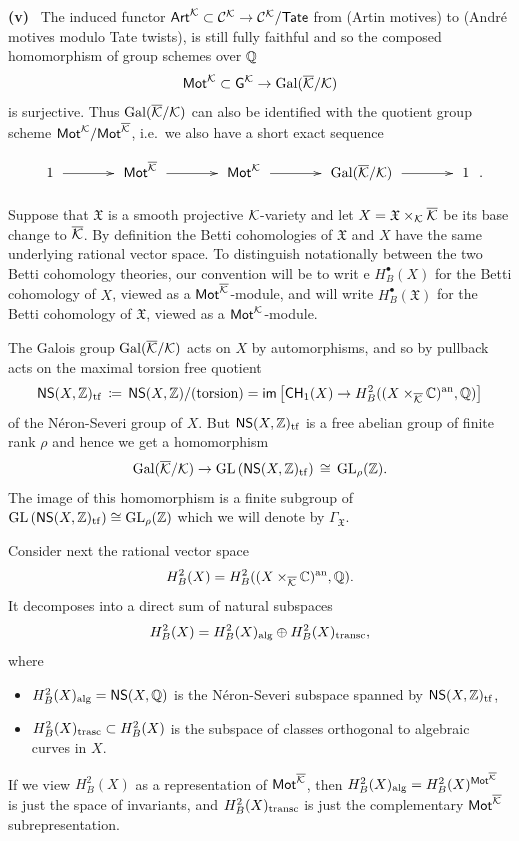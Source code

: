\documentclass[twoside,leqno]{article}
\numberwithin{equation}{section}
\theoremstyle{plain}
\theoremstyle{definition}
\begin{document}
\medskip

\noindent
{\bfseries (v)} \ The induced functor $\mathsf{Art}^{\mathcal K}  \subset \mathcal{C}^{\mathcal K}
\to \mathcal{C}^{\mathcal K}/\mathsf{Tate}$ from (Artin motives) to (Andr\'{e}
motives modulo Tate twists), is still fully faithful and so the
composed homomorphism of group schemes over $\mathbb Q$
\[
\mathsf{Mot}^{\mathcal K} \subset \mathsf{G}^{\mathcal K} \to \operatorname{Gal}(\overline{\mathcal K}/\mathcal K)
\]
is surjective. Thus $\operatorname{Gal}(\overline{\mathcal K}/\mathcal K)$ can also be
identified with the quotient group scheme
$\mathsf{Mot}^{\mathcal K}/\mathsf{Mot}^{\overline{\mathcal K}}$,  i.e.\ we also  
have a short exact sequence
\[
\xymatrix@1@M+0.5pc@C+1pc{ 1 \ar[r] & \motM^{\kaybar} \ar[r] & \motM^{\kay}
  \ar[r] & \Gal(\kaybar/\kay) \ar[r] & 1}.
\]


Suppose that $\mathfrak{X}$ is a smooth projective $\mathcal K$-variety and
let $X = \mathfrak{X}\times_{\mathcal K} \overline{\mathcal K}$ be its base change to
$\overline{\mathcal K}$. By definition the Betti cohomologies of $\mathfrak{X}$ and
$X$ have the same underlying rational vector space. To distinguish
notationally between the two Betti cohomology theories, our convention
will be to writ e $H^{\bullet}_{B}(X)$ for the Betti cohomology of
$X$, viewed as a $\mathsf{Mot}^{\overline{\mathcal K}}$-module, and will write
$H^{\bullet}_{B}(\mathfrak{X})$ for the Betti cohomology of
$\mathfrak{X}$, viewed as a $\mathsf{Mot}^{\mathcal K}$-module. 

\medskip


The Galois group $\operatorname{Gal}(\overline{\mathcal K}/\mathcal K)$ acts on
$X$ by automorphisms, and so by pullback acts on the maximal torsion
free quotient  
\[
\mathsf{NS}(X,\mathbb Z)_{\operatorname{tf}} \, \coloneqq \, \mathsf{NS}(X,\mathbb Z)/(\text{torsion}) =
\mathsf{im}\left[\mathsf{CH}_{1}(X) \to
  H^{2}_{B}((X\times_{\overline{\mathcal K}}\mathbb C)^{\operatorname{an}},\mathbb Q)\right]
\]
of the N\'{e}ron-Severi group of $X$. But
$\mathsf{NS}(X,\mathbb Z)_{\operatorname{tf}}$ is a free abelian group of
finite rank $\rho$ and hence we get a homomorphism
\[
\operatorname{Gal}(\overline{\mathcal K}/\mathcal K) \to
\operatorname{GL}\left(\mathsf{NS}(X,\mathbb Z)_{\operatorname{tf}}\right) \, \cong
\, \operatorname{GL}_{\rho}(\mathbb Z).
\]
The image of this homomorphism is a finite subgroup of
$\operatorname{GL}\left(\mathsf{NS}(X,\mathbb Z)_{\operatorname{tf}}\right) \cong
\operatorname{GL}_{\rho}(\mathbb Z)$ which we will denote by $\Gamma_{\mathfrak{X}}$.

\medskip

Consider next the rational vector space 
\[
H^{2}_{B}(X) =
H^{2}_{B}((X\times_{\overline{\mathcal K}} \mathbb C)^{\operatorname{an}},\mathbb Q).
\]
It decomposes into a direct sum  of natural subspaces 
\begin{equation} \label{eq:decompH2X}
H^{2}_{B}(X) =  H^{2}_{B}(X)_{\operatorname{alg}}\oplus H^{2}_{B}(X)_{\operatorname{transc}},
\end{equation}
where
\begin{itemize}
\item $H^{2}_{B}(X)_{\operatorname{alg}} = \mathsf{NS}(X,\mathbb Q)$ is the N\'{e}ron-Severi
  subspace  spanned by
  $\mathsf{NS}(X,\mathbb Z)_{\operatorname{tf}}$,
\item $H^{2}_{B}(X)_{\operatorname{trasc}} \subset H^{2}_{B}(X)$ is the subspace
  of classes orthogonal to algebraic curves in $X$.
\end{itemize} 
If we view $H^{2}_{B}(X)$ as a representation of $\mathsf{Mot}^{\overline{\mathcal K}}$,
then $H^{2}_{B}(X)_{\operatorname{alg}} = H^{2}_{B}(X)^{\mathsf{Mot}^{\overline{\mathcal K}}}$ is
just the space of invariants, and $H^{2}_{B}(X)_{\operatorname{transc}}$ is just
the complementary $\mathsf{Mot}^{\overline{\mathcal K}}$ subrepresentation.
\end{document}
